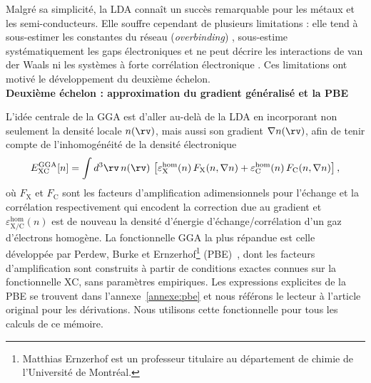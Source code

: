 Malgré sa simplicité, la LDA connaît un succès remarquable pour les métaux et les semi-conducteurs. Elle souffre cependant de plusieurs limitations : elle tend à sous-estimer les constantes du réseau (\textit{overbinding}) \cite{perdewAtomsMoleculesSolids1992}, sous-estime systématiquement les gaps électroniques \cite{perdewPhysicalContentExact1983,shamDensityFunctionalTheoryEnergy1983} et ne peut décrire les interactions de van der Waals \cite{grimmeAccurateDescriptionVan2004,rapcewiczFluctuationAttractionCondensed1991} ni les systèmes à forte corrélation électronique \cite{BasisElectronTheory,imadaMetalinsulatorTransitions1998,anisimovBandTheoryMott1991,georgesDynamicalMeanfieldTheory1996}. Ces limitations ont motivé le développement du deuxième échelon.\\
\noindent
\textbf{Deuxième échelon : approximation du gradient généralisé et la PBE}

L'idée centrale de la GGA est d'aller au-delà de la LDA en incorporant non seulement la densité locale $n(\rv)$, mais aussi son gradient $\nabla n(\rv)$, afin de tenir compte de l'inhomogénéité de la densité électronique
\begin{equation}
    E_\text{XC}^\text{GGA}[n]=\int d^3\rv\,n(\rv)\,\left[\varepsilon_\text{X}^\text{hom}(n)\,F_\text{X}(n,\nabla n)+\varepsilon_\text{C}^\text{hom}(n)\,F_\text{C}(n,\nabla n)\right],
\end{equation}
où $F_\text{X}$ et $F_\text{C}$ sont les facteurs d'amplification adimensionnels pour l'échange et la corrélation respectivement qui encodent la correction due au gradient et $\varepsilon_\text{X/C}^\text{hom}(n)$ est de nouveau la densité d'énergie d'échange/corrélation d'un gaz d'électrons homogène. La fonctionnelle GGA la plus répandue est celle développée par Perdew, Burke et Ernzerhof\footnote{Matthias Ernzerhof est un professeur titulaire au département de chimie de l'Université de Montréal.} (PBE)~\cite{perdewGeneralizedGradientApproximation1996a}, dont les facteurs d'amplification sont construits à partir de conditions exactes connues sur la fonctionnelle XC, sans paramètres empiriques. Les expressions explicites de la PBE se trouvent dans l'annexe~\ref{annexe:pbe} et nous référons le lecteur à l'article original pour les dérivations. Nous utilisons cette fonctionnelle pour tous les calculs de ce mémoire.

